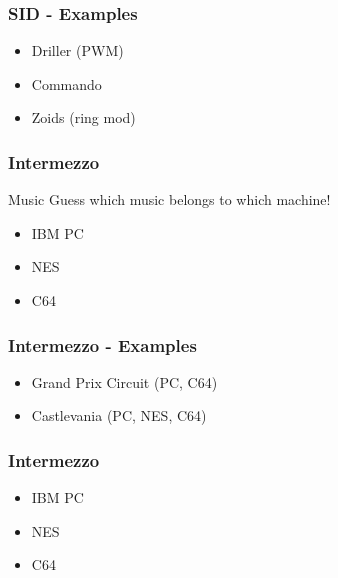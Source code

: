 
\begin{frame}
\frametitle{SID - Examples}

\begin{itemize}
\item Driller (PWM)
\item Commando
\item Zoids (ring mod)
\end{itemize}

\end{frame}


\begin{frame}
\frametitle{Intermezzo}

\begin{block}{Music}
Guess which music belongs to which machine!
\end{block}

\begin{itemize}
\item IBM PC
\item NES
\item C64
\end{itemize}

\end{frame}


\begin{frame}
\frametitle{Intermezzo - Examples}

\begin{itemize}
\item Grand Prix Circuit (PC, C64)
\item Castlevania (PC, NES, C64)
\end{itemize}

\end{frame}


\begin{frame}
\frametitle{Intermezzo}

\begin{itemize}
\item IBM PC
\item NES
\item C64
\end{itemize}

\end{frame}

